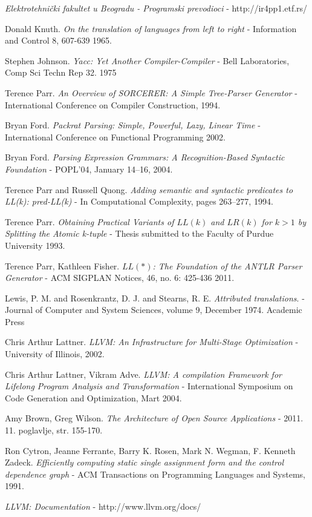 \begin{thebibliography}{9}

	\emph{Elektrotehnički fakultet u Beogradu - Programski prevodioci}
	- http://ir4pp1.etf.rs/

	Donald Knuth.
	\emph{On the translation of languages from left to right}
	- Information and Control 8, 607-639
	1965.

	Stephen Johnson.
	\emph{Yacc: Yet Another Compiler-Compiler}
	- Bell Laboratories, Comp Sci Techn Rep 32. 
	1975

	Terence Parr.
	\emph{An Overview of SORCERER: A Simple Tree-Parser Generator}
	- International Conference on Compiler Construction,
	1994.

	Bryan Ford.
	\emph{Packrat Parsing: Simple, Powerful, Lazy, Linear Time}
	-  International Conference on Functional Programming
	2002.

	Bryan Ford.
	\emph{Parsing Expression Grammars:
A Recognition-Based Syntactic Foundation
}
	-  POPL’04, January 14–16, 2004.

	Terence Parr and Russell Quong.
	\emph{Adding semantic and syntactic predicates to LL(k): pred-LL(k)}
	- In Computational Complexity, pages 263–277,
	1994.

	Terence Parr.
	\emph{Obtaining Practical Variants of $LL(k)$ and $LR(k)$ for $k>1$ by Splitting the Atomic k-tuple}
	- Thesis submitted to the Faculty of Purdue University
	1993.

	Terence Parr, Kathleen Fisher.
	\emph{$LL(*)$: The Foundation of the ANTLR Parser Generator}
	- ACM SIGPLAN Notices, 46, no. 6: 425-436
	2011.

	Lewis, P. M. and Rosenkrantz, D. J. and Stearns, R. E.
	\emph{Attributed translations}.
	- Journal of Computer and System Sciences, 
	volume 9,
	December 1974.
	Academic Press

	Chris Arthur Lattner.
	\emph{LLVM: An Infrastructure for Multi-Stage Optimization}
	- University of Illinois, 2002.
	
	Chris Arthur Lattner, Vikram Adve.
	\emph{LLVM: A compilation Framework for Lifelong Program Analysis and Transformation}
	- International Symposium on Code Generation and Optimization, Mart 2004.
	
	Amy Brown, Greg Wilson.
	\emph{The Architecture of Open Source Applications}
	- 2011. 11. poglavlje, str. 155-170. 

	Ron Cytron, Jeanne Ferrante, Barry K. Rosen, Mark N. Wegman, F. Kenneth Zadeck.
	\emph{Efficiently computing static single assignment form and the control dependence graph}
	- ACM Transactions on Programming Languages and Systems, 1991. 


	\emph{LLVM: Documentation}
	- http://www.llvm.org/docs/

\end{thebibliography}